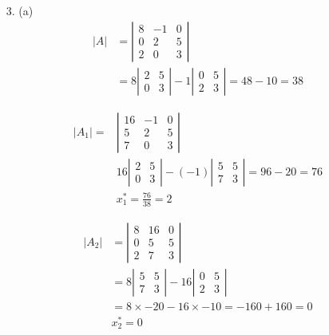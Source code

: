 \documentclass{./../../Latex/homework}
\begin{document}
\begin{enumerate}
\item[3.] (a) $$
\begin{aligned}
|A| & =\left|\begin{array}{rrr}
8 & -1 & 0 \\
0 & 2 & 5 \\
2 & 0 & 3
\end{array}\right| \\
& =8\left|\begin{array}{cc}
2 & 5 \\
0 & 3
\end{array}\right|-1\left|\begin{array}{ll}
0 & 5 \\
2 & 3
\end{array}\right|=48-10=38
\end{aligned}
$$

$$
\begin{aligned}
\left|A_{1}\right|= & \left|\begin{array}{ccc}
16 & -1 & 0 \\
5 & 2 & 5 \\
7 & 0 & 3
\end{array}\right| \\
& 16\left|\begin{array}{cc}
2 & 5 \\
0 & 3
\end{array}\right|-(-1)\left|\begin{array}{rr}
5 & 5 \\
7 & 3
\end{array}\right|=96-20=76 \\
& x_{1}^{*}=\frac{76}{38}=2
\end{aligned}
$$


$$
\begin{aligned}
\left|A_{2}\right| & =\left|\begin{array}{ccc}
8 & 16 & 0 \\
0 & 5 & 5 \\
2 & 7 & 3
\end{array}\right| \\
& =8\left|\begin{array}{cc}
5 & 5 \\
7 & 3
\end{array}\right|-16\left|\begin{array}{cc}
0 & 5 \\
2 & 3
\end{array}\right| \\
& =8 \times-20-16 \times-10=-160+160=0 \\
& x_{2}^{*}=0
\end{aligned}
$$


\end{enumerate}
\end{document}
